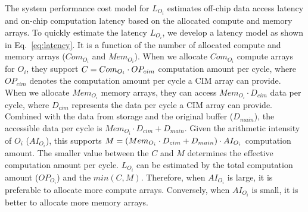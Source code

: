 The system performance cost model for $L_{O_i}$ estimates off-chip data access latency and on-chip computation latency based on the allocated compute and memory arrays.
To quickly estimate the latency $L_{O_i}$, we develop a latency model as shown in Eq.~\ref{eq:latency}. 
It is a function of the number of allocated compute and memory arrays ($Com_{O_i}$ and $Mem_{O_i}$).
When we allocate $Com_{O_i}$ compute arrays for $O_i$, they support $\scriptsize C=Com_{O_i} \cdot OP_{cim}$ computation amount per cycle, where $OP_{cim}$ denotes the computation amount per cycle a CIM array can provide. 
When we allocate $Mem_{O_i}$ memory arrays, they can access $Mem_{O_i} \cdot D_{cim}$ data per cycle, where $D_{cim}$ represents the data per cycle a CIM array can provide. Combined with the data from storage and the original buffer ($D_{main}$), the accessible data per cycle is $Mem_{O_i} \cdot D_{cim} + D_{main}$. Given the arithmetic intensity of $O_i$ ($AI_{O_i}$), this supports $\scriptsize M=(Mem_{O_i} \cdot D_{cim} + D_{main}) \cdot AI_{O_i}$ computation amount.
The smaller value between the $C$ and $M$ determines the effective computation amount per cycle.
$L_{O_i}$ can be estimated by the total computation amount ($OP_{O_i}$) and the $min(C,M)$.
Therefore, when $AI_{O_i}$ is large, it is preferable to allocate more compute arrays. Conversely, when $AI_{O_i}$ is small, it is better to allocate more memory arrays.

